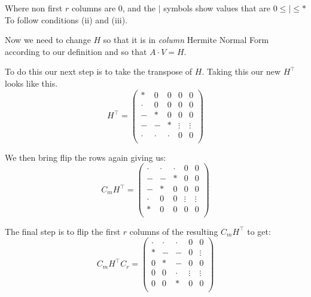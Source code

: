\documentclass[oneside, a4paper, onecolumn, 11pt]{article}
\begin{document}
Where non first \(r\) columns are \(0\), and the \(|\) symbols show values that are \(0 \le | \le *\) To follow conditions (ii) and (iii).

Now we need to change \(H\) so that it is in \textit{column} Hermite Normal Form according to our definition and so that \(A \cdot V = H\).

To do this our next step is to take the transpose of \(H\). Taking this our new \(H^\intercal\) looks like this.
\[
    H^\intercal = \left(
    \begin{array}{ccccc}
            *     & 0     & 0     & 0      & 0      \\
            \cdot & 0     & 0     & 0      & 0      \\
            -     & *     & 0     & 0      & 0      \\
            -     & -     & *     & \vdots & \vdots \\
            \cdot & \cdot & \cdot & 0      & 0      \\
        \end{array}
    \right)
\]

We then bring flip the rows again giving us:
\[
    C_m H^\intercal = \left(
    \begin{array}{ccccc}
            \cdot & \cdot & \cdot & 0      & 0      \\
            -     & -     & *     & 0      & 0      \\
            -     & *     & 0     & 0      & 0      \\
            \cdot & 0     & 0     & \vdots & \vdots \\
            *     & 0     & 0     & 0      & 0      \\
        \end{array}
    \right)
\]

The final step is to flip the first \(r\) columns of the resulting \(C_m H^\intercal\) to get:
\[
    C_m H^\intercal C_r = \left(
    \begin{array}{ccccc}
            \cdot & \cdot & \cdot & 0      & 0      \\
            *     & -     & -     & 0      & \vdots \\
            0     & *     & -     & 0      & 0      \\
            0     & 0     & \cdot & \vdots & \vdots \\
            0     & 0     & *     & 0      & 0      \\
        \end{array}
    \right)
\]
\end{document}
